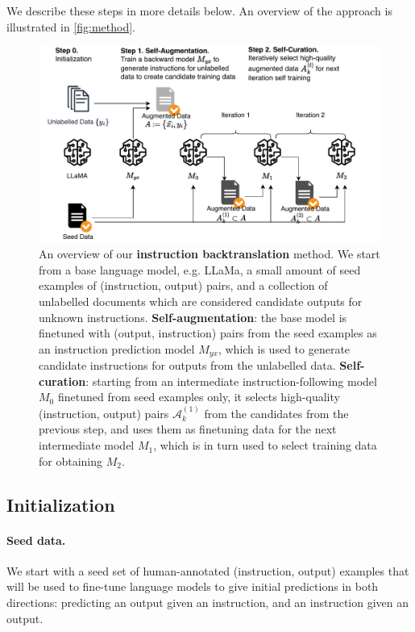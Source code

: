 We describe these steps in more details below. An overview of the approach is illustrated in \autoref{fig:method}.
\begin{figure}
  \centering
  \includegraphics[width=1.0\columnwidth]{figs/fuzzy_v3.pdf}
  \caption{An overview of our {\bf instruction backtranslation} method. We start from a base language model, e.g. LLaMa, a small amount of seed examples of (instruction, output) pairs, and a collection of unlabelled documents which are considered candidate outputs for unknown instructions. \textbf{Self-augmentation}: the base model is finetuned with (output, instruction) pairs from the seed examples as an instruction prediction model
  $M_{yx}$, which is used to generate candidate instructions for outputs from the unlabelled data. \textbf{Self-curation}: starting from an intermediate instruction-following model $M_0$ finetuned from seed examples only, it selects high-quality (instruction, output) pairs $\mathcal{A}_k^{(1)}$ from the candidates from the previous step, and uses them as finetuning data for the next intermediate model $M_1$, which is in turn used to select training data for obtaining $M_2$. }
  \label{fig:method}
\end{figure}
\vspace{-3mm}

\subsection{Initialization}
\paragraph{Seed data.} We start with a seed set of human-annotated (instruction, output) examples that will be used to fine-tune language models to give initial predictions in both directions: predicting an output given an instruction, and an instruction given an output. 

